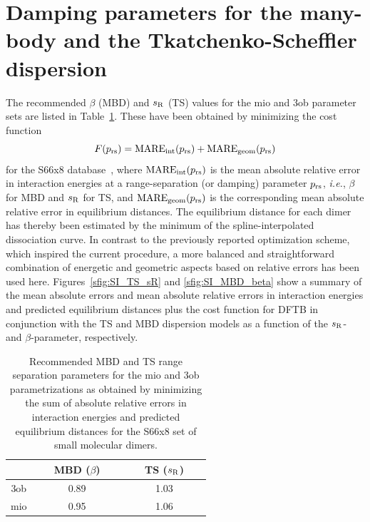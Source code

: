 \documentclass[aip,jcp]{revtex4-1}
\begin{document}
\section{Damping parameters for the many-body and the Tkatchenko-Scheffler
  dispersion}

The recommended $\beta$ (MBD) and $s_{\rm R}$ (TS) values for the mio and 3ob parameter sets are listed in Table~\ref{stab:MBD_TS_rangeseparation}.
These have been obtained by minimizing the cost function
\begin{equation}
    F(p_{\rm rs}) = \mathrm{MARE_{int}}(p_{\rm rs}) + \mathrm{MARE_{geom}}(p_{\rm rs})
\end{equation}
for the S66x8 database~\cite{Rezac2011_S66x8}, where $\mathrm{MARE_{int}}(p_{\rm rs})$ is the mean absolute relative error in interaction energies at a range-separation (or damping) parameter $p_{\rm rs}$, \textit{i.e.}, $\beta$ for MBD and $s_{\rm R}$ for TS, and $\mathrm{MARE_{geom}}(p_{\rm rs})$ is the corresponding mean absolute relative error in equilibrium distances. The equilibrium distance for each dimer has thereby been estimated by the minimum of the spline-interpolated dissociation curve. In contrast to the previously reported optimization scheme,\cite{mortazavi2018} which inspired the current procedure, a more balanced and straightforward combination of energetic and geometric aspects based on relative errors has been used here. Figures~\ref{sfig:SI_TS_sR} and \ref{sfig:SI_MBD_beta} show a summary of the mean absolute errors and mean absolute relative errors in interaction energies and predicted equilibrium distances plus the cost function for DFTB in conjunction with the TS and MBD dispersion models as a function of the $s_{\rm R}$- and $\beta$-parameter, respectively.

\begin{table}[htbp]
  \centering
  \caption{Recommended MBD and TS range separation parameters for the mio and
    3ob parametrizations as obtained by minimizing the sum of absolute relative
    errors in interaction energies and predicted equilibrium distances for the
    S66x8 set\cite{Rezac2011_S66x8} of small molecular dimers.}
  \label{stab:MBD_TS_rangeseparation}
  \begin{tabular}{c c c}\hline\hline
    & ~~~MBD ($\beta$)~~~ & ~~~TS ($s_{\rm R}$)~~~ \\\hline
    3ob & 0.89 & 1.03 \\
    mio & 0.95 & 1.06 \\\hline\hline
  \end{tabular}
\end{table}
\end{document}
